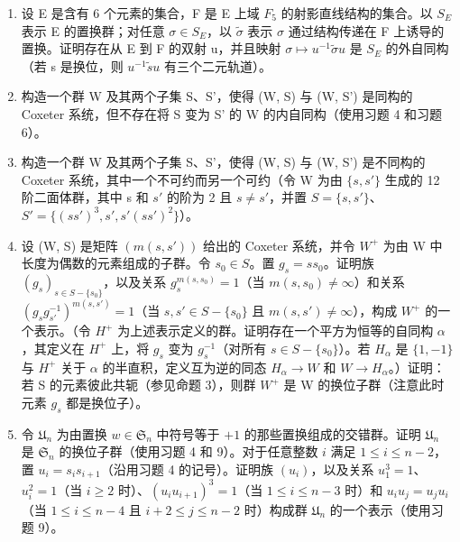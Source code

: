 \begin{enumerate}
\def\labelenumi{\arabic{enumi})}
\setcounter{enumi}{5}
\item
  设 E 是含有 6 个元素的集合，F 是 E 上域 \(F_{5}\) 的射影直线结构的集合。以 \(S_{E}\) 表示 E 的置换群；对任意 \(\sigma \in S_{E}\)，以 \(\tilde{\sigma}\) 表示 \(\sigma\) 通过结构传递在 F 上诱导的置换。证明存在从 E 到 F 的双射 u，并且映射 \(\sigma \mapsto u^{-1}\tilde{\sigma}u\) 是 \(S_{E}\) 的外自同构（若 s 是换位，则 \(u^{-1}\tilde{s}u\) 有三个二元轨道）。
\item
  构造一个群 W 及其两个子集 S、S'，使得 (W, S) 与 (W, S') 是同构的 Coxeter 系统，但不存在将 S 变为 S' 的 W 的内自同构（使用习题 4 和习题 6）。
\item
  构造一个群 W 及其两个子集 S、S'，使得 (W, S) 与 (W, S') 是不同构的 Coxeter 系统，其中一个不可约而另一个可约（令 W 为由 \(\{s, s'\}\) 生成的 12 阶二面体群，其中 s 和 \(s'\) 的阶为 2 且 \(s \neq s'\)，并置 \(S = \{s, s'\}\)、\(S' = \{(ss')^3, s', s'(ss')^2\}\)）。
\item
  设 (W, S) 是矩阵 \((m(s, s'))\) 给出的 Coxeter 系统，并令 \(W^{+}\) 为由 W 中长度为偶数的元素组成的子群。令 \(s_{0} \in S\)。置 \(g_{s} = ss_{0}\)。证明族 \((g_{s})_{s \in S - \{s_{0}\}}\)，以及关系 \(g_{s}^{m(s, s_{0})} = 1\)（当 \(m(s, s_{0}) \neq \infty\)）和关系 \((g_{s} g_{s'}^{-1})^{m(s, s')} = 1\)（当 \(s, s' \in S - \{s_{0}\}\) 且 \(m(s, s') \neq \infty\)），构成 \(W^{+}\) 的一个表示。（令 \(H^{+}\) 为上述表示定义的群。证明存在一个平方为恒等的自同构 \(\alpha\)，其定义在 \(H^{+}\) 上，将 \(g_{s}\) 变为 \(g_{s}^{-1}\)（对所有 \(s \in S - \{s_{0}\}\)）。若 \(H_{\alpha}\) 是 \(\{1, -1\}\) 与 \(H^{+}\) 关于 \(\alpha\) 的半直积，定义互为逆的同态 \(H_{\alpha} \to W\) 和 \(W \to H_{\alpha}\)。）证明：若 S 的元素彼此共轭（参见命题 3），则群 \(W^{+}\) 是 W 的换位子群（注意此时元素 \(g_{s}\) 都是换位子）。
\item
  令 \(\mathfrak{U}_n\) 为由置换 \(w \in \mathfrak{S}_n\) 中符号等于 \(+1\) 的那些置换组成的交错群。证明 \(\mathfrak{U}_n\) 是 \(\mathfrak{S}_n\) 的换位子群（使用习题 4 和 9）。对于任意整数 \(i\) 满足 \(1 \leqslant i \leqslant n - 2\)，置 \(u_i = s_i s_{i+1}\)（沿用习题 4 的记号）。证明族 \((u_i)\)，以及关系 \(u_1^3 = 1\)、\(u_i^2 = 1\)（当 \(i \geqslant 2\) 时）、\((u_i u_{i+1})^3 = 1\)（当 \(1 \leqslant i \leqslant n - 3\) 时）和 \(u_i u_j = u_j u_i\)（当 \(1 \leqslant i \leqslant n - 4\) 且 \(i + 2 \leqslant j \leqslant n - 2\) 时）构成群 \(\mathfrak{U}_n\) 的一个表示（使用习题 9）。
\end{enumerate}


